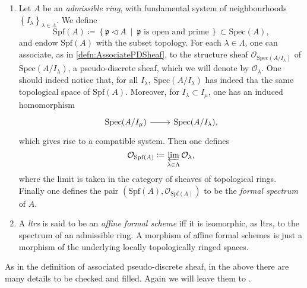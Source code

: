 \documentclass[../Main]{subfiles}
\begin{document}
\begin{defn}\leavevmode\vspace{-\baselineskip}
\begin{enumerate}
\item Let $A$ be an {\em admissible ring}, with fundamental system of
	neighbourhoods $\left\{ I_\lambda \right\}_{\lambda \in \Lambda}$.
	We define
	\begin{equation*}
	\mathrm{Spf}(A) \coloneqq
	\left\{ \mathfrak{p} \triangleleft A \ \middle|\ \mathfrak{p}
	\text{ is open and prime}\, \right\} \subset \mathrm{Spec}(A)
	,\end{equation*}
	and endow $\mathrm{Spf}(A)$ with the subset topology.
	For each $\lambda \in \Lambda$, one can associate,
	as in \cref{defn:AssociatePDSheaf},
	to the structure sheaf $\mathcal{O}_{\mathrm{Spec}(A/I_\lambda)}$
	of $\mathrm{Spec}(A/I_\lambda)$,
	a pseudo-discrete sheaf, which we will denote by $\mathcal{O}_\lambda$.
	One should indeed notice that, for all $I_\lambda$,
	$\mathrm{Spec}(A/I_\lambda)$ has indeed tha the same topological space
	of $\mathrm{Spf}(A)$.
	Moreover, for $I_\lambda \subset I_\mu$, one has an induced homomorphism
	\begin{equation*}
	\begin{tikzcd}[row sep = 0ex
		,/tikz/column 1/.append style={anchor=base east}
		,/tikz/column 2/.append style={anchor=base west}]
		\mathrm{Spec}(A/I_\mu) \arrow[r, "", rightarrow] &
		\mathrm{Spec}(A/I_\lambda)
	,\end{tikzcd}
	\end{equation*} 
	which gives rise to a compatible system.
	Then one defines
	\begin{equation*}
	\mathcal{O}_{\mathrm{Spf}(A)} \coloneqq
	\varprojlim_{\lambda \in \Lambda} \mathcal{O}_\lambda
	,\end{equation*}
	where the limit is taken in the category of sheaves of topological rings.
	Finally one defines the pair $( \mathrm{Spf}(A) , \mathcal{O}_{ \mathrm{Spf}(A) } )$
	to be the {\em formal spectrum} of $A$.

\item A {\em ltrs} is said to be an {\em affine formal scheme} iff it is isomorphic,
	as ltrs, to the spectrum of an admissible ring.
	A morphism of affine formal schemes is just a morphism of the underlying
	locally topologically ringed spaces.
\end{enumerate}
\end{defn}


\begin{rem}[]
	As in the definition of associated pseudo-discrete sheaf, in the above
	there are many details to be checked and filled.
	Again we will leave them to \cite[\S10]{EGA1}.
\end{rem}
\end{document}
